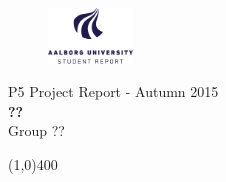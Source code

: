 \clearpage
\thispagestyle{empty}

\begin{figure}[H]
	\raggedleft
		\includegraphics[width=0.2\textwidth]{figures/aaulogo-en.png}
\end{figure}
\vspace*{\fill} 
\begin{center}
\begin{Huge}
P5 Project Report - Autumn 2015\\
\vspace{5 mm}
\textbf{??}\\
\vspace{3 mm}
Group ??
\end{Huge}
\end{center}
\vspace*{\fill}

\begin{center}
\line(1,0){400}
\end{center}